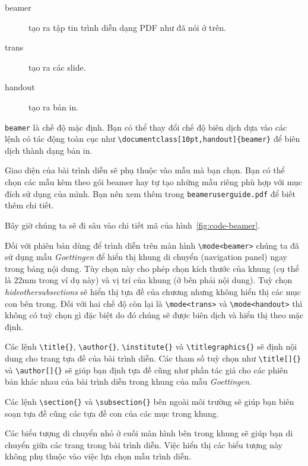 \begin{description}
\item[beamer] tạo ra tập tin trình diễn dạng PDF như đã nói ở trên.
\item[trans] tạo ra các slide.
\item[handout] tạo ra bản in.
\end{description}
\texttt{beamer} là chế độ mặc định. Bạn có thể thay đổi chế độ biên dịch dựa vào các lệnh có tác động toàn cục như
\verb|\documentclass[10pt,handout]{beamer}| để biên dịch thành dạng bản in.

Giao diện của bài trình diễn sẽ phụ thuộc vào mẫu mà bạn chọn. Bạn có thể chọn các mẫu kèm theo gói beamer hay tự tạo những mẫu riêng phù hợp với mục đích sử dụng của mình. Bạn nên xem thêm trong \texttt{beameruserguide.pdf} để biết thêm chi tiết.

Bây giờ chúng ta sẽ đi sâu vào chi tiết mã của hình~\ref{fig:code-beamer}.

Đối với phiên bản dùng để trình diễn trên màn hình \verb|\mode<beamer>| chúng ta đã sử dụng mẫu \emph{Goettingen} để hiển thị khung di chuyển (navigation panel) ngay trong bảng nội dung. Tùy chọn này cho phép chọn kích thước của khung (cụ thể là 22mm trong ví dụ này) và vị trí của khung (ở bên phải nội dung). Tuỳ chọn \emph{hideothersubsections} sẽ hiển thị tựa đề của chương nhưng không hiển thị các mục con bên trong. Đối với hai chế độ còn lại là \verb|\mode<trans>| và \verb|\mode<handout>| thì không có tuỳ chọn gì đặc biệt do đó chúng sẽ được biên dịch và hiển thị theo mặc định.

Các lệnh \verb|\title{}|, \verb|\author{}|, \verb|\institute{}| và \verb|\titlegraphics{}| sẽ định nội dung cho trang tựa đề của bài trình diễn. Các tham số tuỳ chọn như \verb|\title[]{}| và \verb|\author[]{}| sẽ giúp bạn định tựa đề cũng như phần tác giả cho các phiên bản khác nhau của bài trình diễn trong khung của mẫu \emph{Goettingen}.

Các lệnh \verb|\section{}| và \verb|\subsection{}| bên ngoài môi trường  sẽ giúp bạn biên soạn tựa đề cũng các tựa đề con của các mục trong khung.

Các biểu tượng di chuyển nhỏ ở cuối màn hình bên trong khung sẽ giúp bạn di chuyển giữa các trang trong bài trình diễn. Việc hiển thị các biểu tượng này không phụ thuộc vào việc lựa chọn mẫu trình diễn.

